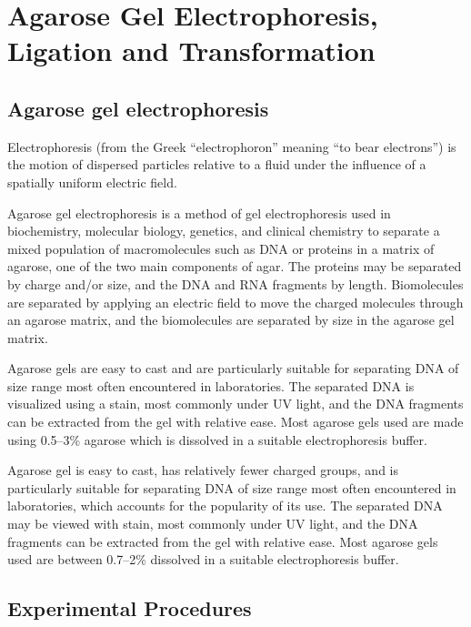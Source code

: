 \documentclass[]{book}
\theoremstyle{definition}
\theoremstyle{definition}
\theoremstyle{definition}
\theoremstyle{remark}
\begin{document}
\chapter{Agarose Gel Electrophoresis, Ligation and
Transformation}\label{agarose-gel-electrophoresis-ligation-and-transformation}

\section{Agarose gel electrophoresis}\label{agarose-gel-electrophoresis}

Electrophoresis (from the Greek ``electrophoron'' meaning ``to bear
electrons'') is the motion of dispersed particles relative to a fluid
under the influence of a spatially uniform electric field.

Agarose gel electrophoresis is a method of gel electrophoresis used in
biochemistry, molecular biology, genetics, and clinical chemistry to
separate a mixed population of macromolecules such as DNA or proteins in
a matrix of agarose, one of the two main components of agar. The
proteins may be separated by charge and/or size, and the DNA and RNA
fragments by length. Biomolecules are separated by applying an electric
field to move the charged molecules through an agarose matrix, and the
biomolecules are separated by size in the agarose gel matrix.

Agarose gels are easy to cast and are particularly suitable for
separating DNA of size range most often encountered in laboratories. The
separated DNA is visualized using a stain, most commonly under UV light,
and the DNA fragments can be extracted from the gel with relative ease.
Most agarose gels used are made using 0.5--3\% agarose which is
dissolved in a suitable electrophoresis buffer.

Agarose gel is easy to cast, has relatively fewer charged groups, and is
particularly suitable for separating DNA of size range most often
encountered in laboratories, which accounts for the popularity of its
use. The separated DNA may be viewed with stain, most commonly under UV
light, and the DNA fragments can be extracted from the gel with relative
ease. Most agarose gels used are between 0.7--2\% dissolved in a
suitable electrophoresis buffer.

\section{Experimental Procedures}\label{experimental-procedures-11}
\end{document}
